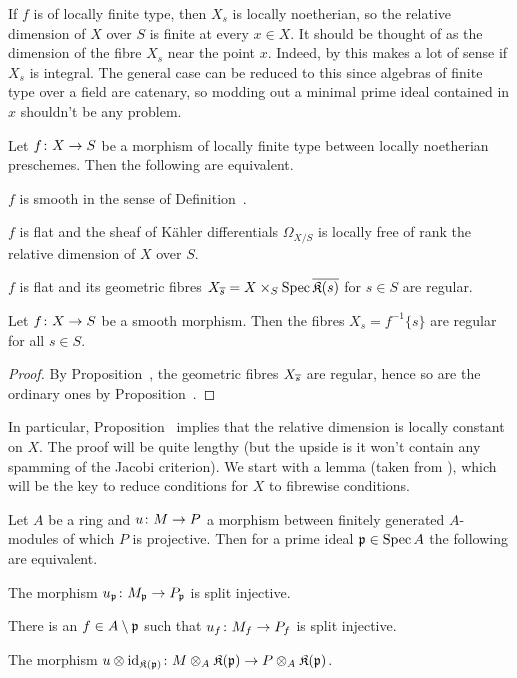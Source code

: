\documentclass[a4paper,parskip=half,numbers=enddot, DIV=12]{scrreprt}
\begin{document}
\begin{rem}
	If $f$ is of locally finite type, then $X_s$ is locally noetherian, so the relative dimension of $X$ over $S$ is finite at every $x\in X$. It should be thought of as the dimension of the fibre $X_s$ near the point $x$. Indeed, by \cite[Theorem~10]{alg1} this makes a lot of sense if $X_s$ is integral. The general case can be reduced to this since algebras of finite type over a field are catenary, so modding out a minimal prime ideal contained in $x$ shouldn't be any problem.
\end{rem}
\begin{prop}
	Let $f\colon X\morphism S$ be a morphism of locally finite type between locally noetherian preschemes. Then the following are equivalent.
	\begin{alphanumerate}
		\item $f$ is smooth in the sense of Definition~.
		\item $f$ is flat and the sheaf of Kähler differentials $\Omega_{X/S}$ is locally free of rank the relative dimension of $X$ over $S$.
		\item $f$ is flat and its geometric fibres $X_{\overline{s}}=X\times_S\operatorname{Spec}\overline{\mathfrak{K}(s)}$ for $s\in S$ are regular.
	\end{alphanumerate}
\end{prop}
\begin{cor}
	Let $f\colon X\morphism S$ be a smooth morphism. Then the fibres $X_s=f^{-1}\{s\}$ are regular for all $s\in S$.
\end{cor}
\begin{proof}
	By Proposition~, the geometric fibres $X_{\overline{s}}$ are regular, hence so are the ordinary ones by Proposition~\itememph{b}.
\end{proof}
In particular, Proposition~ implies that the relative dimension is locally constant on $X$. The proof will be quite lengthy (but the upside is it won't contain any spamming of the Jacobi criterion). We start with a lemma (taken from \cite[Ch. (19.1.12)]{egaIV1}), which will be the key to reduce conditions for $X$ to fibrewise conditions.
\begin{lem}
	Let $A$ be a ring and $u\colon M\morphism P$ a morphism between finitely generated $A$-modules of which $P$ is projective. Then for a prime ideal $\mathfrak{p}\in\operatorname{Spec} A$ the following are equivalent.
\begin{alphanumerate}
	\item The morphism $u_\pp\colon M_\pp\morphism P_\pp$ is split injective.
	\item There is an $f\in A\setminus \mathfrak{p}$ such that $u_f\colon M_f\morphism P_f$ is split injective.
	\item The morphism $u\otimes\id_{\KK(\pp)}\colon M\otimes_A\KK(\pp)\morphism P\otimes_A\KK(\pp)$.
\end{alphanumerate}
\end{lem}
\end{document}
